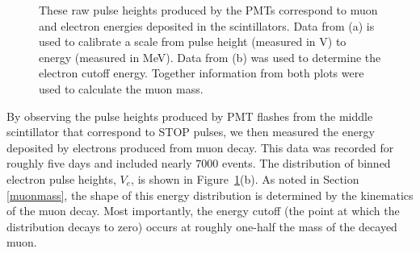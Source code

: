\begin{figure}[htbp]
\begin{center}
\hspace{-1mm}
\vspace{-2mm}
\vspace{-2mm}
\caption{These raw pulse heights produced by the PMTs correspond to muon and electron energies deposited in the scintillators.  Data from (a) is used to calibrate a scale from pulse height (measured in V) to energy (measured in MeV).  Data from (b) was used to determine the electron cutoff energy.  Together information from both plots were used to calculate the muon mass.}
\label{fig:pulseheights}
\end{center}
\end{figure}


By observing the pulse heights produced by PMT flashes from the middle
scintillator that correspond to STOP pulses, we then measured the
energy deposited by electrons produced from muon decay.  This data was
recorded for roughly five days and included nearly $7000$ events.  The
distribution of binned electron pulse heights, $V_{e}$, is shown in
Figure~\ref{fig:pulseheights}(b).  As noted in Section \ref{muonmass}, the shape of this energy
distribution is determined by the kinematics of the muon decay.  Most
importantly, the energy cutoff (the point at which the distribution
decays to zero) occurs at roughly one-half the mass of the decayed
muon.




